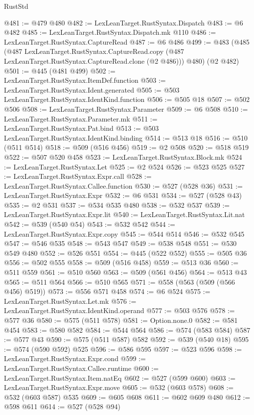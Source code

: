 \begin{lexlean}{RustStd}
\begin{coremodule}
@481 := @479 @480
@482 := LexLeanTarget.RustSyntax.Dispatch
@483 := @6 @482
@485 := LexLeanTarget.RustSyntax.Dispatch.mk @110
@486 := LexLeanTarget.RustSyntax.CaptureRead
@487 := @6 @486
@499 := @483
    (@485
      (@487
        LexLeanTarget.RustSyntax.CaptureRead.copy
        (@487 LexLeanTarget.RustSyntax.CaptureRead.clone (@2 @486)))
      @480)
    (@2 @482)
@501 := @445 (@481 @499)
@502 := LexLeanTarget.RustSyntax.ItemDef.function
@503 := LexLeanTarget.RustSyntax.Ident.generated
@505 := @503 LexLeanTarget.RustSyntax.IdentKind.function
@506 := @505 @18
@507 := @502 @506
@508 := LexLeanTarget.RustSyntax.Parameter
@509 := @6 @508
@510 := LexLeanTarget.RustSyntax.Parameter.mk
@511 := LexLeanTarget.RustSyntax.Pat.bind
@513 := @503 LexLeanTarget.RustSyntax.IdentKind.binding
@514 := @513 @18
@516 := @510 (@511 @514)
@518 := @509 (@516 @456)
@519 := @2 @508
@520 := @518 @519
@522 := @507 @520 @458
@523 := LexLeanTarget.RustSyntax.Block.mk
@524 := LexLeanTarget.RustSyntax.Let
@525 := @2 @524
@526 := @523 @525
@527 := LexLeanTarget.RustSyntax.Expr.call
@528 := LexLeanTarget.RustSyntax.Callee.function
@530 := @527 (@528 @36)
@531 := LexLeanTarget.RustSyntax.Expr
@532 := @6 @531
@534 := @527 (@528 @43)
@535 := @2 @531
@537 := @534 @535 @480
@538 := @532 @537
@539 := LexLeanTarget.RustSyntax.Expr.lit
@540 := LexLeanTarget.RustSyntax.Lit.nat
@542 := @539 (@540 @54)
@543 := @532 @542
@544 := LexLeanTarget.RustSyntax.Expr.copy
@545 := @544 @514
@546 := @532 @545
@547 := @546 @535
@548 := @543 @547
@549 := @538 @548
@551 := @530 @549 @480
@552 := @526 @551
@554 := @445 (@522 @552)
@555 := @505 @36
@556 := @502 @555
@558 := @509 (@516 @458)
@559 := @513 @36
@560 := @511 @559
@561 := @510 @560
@563 := @509 (@561 @456)
@564 := @513 @43
@565 := @511 @564
@566 := @510 @565
@571 := @558 (@563 (@509 (@566 @456) @519))
@573 := @556 @571 @458
@574 := @6 @524
@575 := LexLeanTarget.RustSyntax.Let.mk
@576 := LexLeanTarget.RustSyntax.IdentKind.operand
@577 := @503 @576
@578 := @577 @36
@580 := @575 (@511 @578)
@581 := Option.none.{0}
@582 := @581 @454
@583 := @580 @582
@584 := @544 @564
@586 := @574 (@583 @584)
@587 := @577 @43
@590 := @575 (@511 @587) @582
@592 := @539 (@540 @18)
@595 := @574 (@590 @592) @525
@596 := @586 @595
@597 := @523 @596
@598 := LexLeanTarget.RustSyntax.Expr.cond
@599 := LexLeanTarget.RustSyntax.Callee.runtime
@600 := LexLeanTarget.RustSyntax.Item.natEq
@602 := @527 (@599 @600)
@603 := LexLeanTarget.RustSyntax.Expr.move
@605 := @532 (@603 @578)
@608 := @532 (@603 @587) @535
@609 := @605 @608
@611 := @602 @609 @480
@612 := @598 @611
@614 := @527 (@528 @94)

\end{coremodule}
\end{lexlean}
